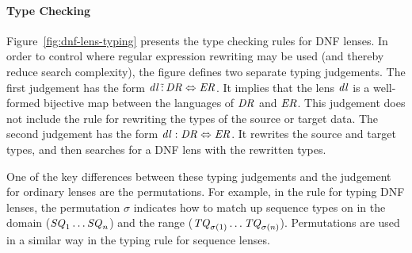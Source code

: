 \documentclass[numbers,10pt,preprint\ifanon ,nocopyrightspace\fi]{sigplanconf}
\begin{document}

\paragraph*{Type Checking}
Figure~\ref{fig:dnf-lens-typing} presents the type checking rules for
DNF lenses.  In order to control where regular expression rewriting
may be used (and thereby reduce search complexity), 
the figure defines two separate typing judgements.
The first judgement has the form 
$\mathit{dl} \,\tilde{:}\, \mathit{DR} \Leftrightarrow \mathit{ER}$.
It implies that the lens $\mathit{dl}$ is a well-formed
bijective map between the
languages of $\mathit{DR}$ and $\mathit{ER}$.  This judgement does
not include the rule for rewriting the types of the source or target
data.  The second judgement has the form 
$\mathit{dl} : \mathit{DR} \Leftrightarrow \mathit{ER}$.  
It rewrites the source and target types, and then searches for a
DNF lens with the rewritten types.

One of the key differences between these typing judgements and the
judgement for ordinary lenses are the permutations.  For example,
in the rule for typing DNF lenses, the permutation $\sigma$
indicates how to match up 
sequence types on in the domain 
($\mathit{SQ}_1\ldots\mathit{SQ}_n$) and the 
range ($\mathit{TQ}_{\sigma(1)}\ldots\mathit{TQ}_{\sigma(n)}$).
Permutations are used in a similar way in the typing rule for
sequence lenses.

\end{document}
